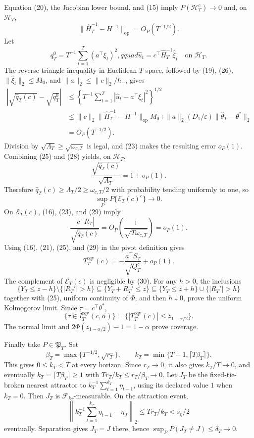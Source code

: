Equation (20), the Jacobian lower bound, and (15) imply \(P(\mathcal H_T^c)\to0\) and, on \(\mathcal H_T\),
\[
 \|\widehat H_T^{-1}-H^{-1}\|_{\mathrm{op}}=O_P(T^{-1/2}).
\tag{26}
\]
Let
\[
 q_T^0=T^{-1}\sum_{t=1}^T(a^\top\xi_t)^2,qquad
 \widehat u_t=c^\top\widehat H_T^{-1}\widehat\xi_t
 \quad\text{on }\mathcal H_T.
\tag{27}
\]
The reverse triangle inequality in Euclidean \(T\)-space, followed by (19), (26), \(\|\widehat\xi_t\|_2\le M_0\), and \(\|a\|_2\le\|c\|_2/h_-\), gives
\[
\begin{aligned}
 \left|\sqrt{\widehat q_T(c)}-\sqrt{q_T^0}\right|
 &\le\left\{T^{-1}\sum_{t=1}^T
 |\widehat u_t-a^\top\xi_t|^2\right\}^{1/2}\\
 &\le \|c\|_2\|\widehat H_T^{-1}-H^{-1}\|_{\mathrm{op}}M_0
 +\|a\|_2(D_1/\varepsilon)\|\widehat\theta_T-\theta^*\|_2\\
 &=O_P(T^{-1/2}).
\end{aligned}
\tag{28}
\]
Division by \(\sqrt{\Lambda_T}\ge\sqrt{\omega_{c,T}}\) is legal, and (23) makes the resulting error \(o_P(1)\).  Combining (25) and (28) yields, on \(\mathcal H_T\),
\[
 \frac{\sqrt{\widehat q_T(c)}}{\sqrt{\Lambda_T}}=1+o_P(1).
\tag{29}
\]
Therefore \(\widehat q_T(c)\ge\Lambda_T/2\ge\omega_{c,T}/2\) with probability tending uniformly to one, so
\[
 \sup_P P\{\mathcal E_T(c)^c\}\longrightarrow0.
\tag{30}
\]
On \(\mathcal E_T(c)\), (16), (23), and (29) imply
\[
 \frac{|c^\top R_T|}{\sqrt{\widehat q_T(c)}}
 =O_P\!\left(\frac1{\sqrt{T\omega_{c,T}}}\right)=o_P(1).
\tag{31}
\]
Using (16), (21), (25), and (29) in the pivot definition gives
\[
 T_T^{\mathrm{rqv}}(c)
 =-\frac{a^\top S_T}{\sqrt{Q_T^c}}+o_P(1).
\tag{32}
\]
The complement of \(\mathcal E_T(c)\) is negligible by (30).  For any \(h>0\), the inclusions
\[
 \{Y_T\le z-h\}\setminus\{|R_T'|>h\}
 \subseteq\{Y_T+R_T'\le z\}
 \subseteq\{Y_T\le z+h\}\cup\{|R_T'|>h\}
\tag{33}
\]
together with (25), uniform continuity of \(\Phi\), and then \(h\downarrow0\), prove the uniform Kolmogorov limit.  Since \(\tau=c^\top\theta^*\),
\[
 \{\tau\in I_T^{\mathrm{rqv}}(c,\alpha)\}
 =\{|T_T^{\mathrm{rqv}}(c)|\le z_{1-\alpha/2}\}.
\tag{34}
\]
The normal limit and \(2\Phi(z_{1-\alpha/2})-1=1-\alpha\) prove coverage.

Finally take \(P\in\mathfrak P_T\).  Set
\[
 \beta_T=\max\{T^{-1/2},\sqrt{r_T}\},\qquad
 k_T=\min\{T-1,\lceil T\beta_T\rceil\}.
\tag{35}
\]
This gives \(0\le k_T<T\) at every horizon.  Since \(r_T\to0\), it also gives \(k_T/T\to0\), and eventually \(k_T=\lceil T\beta_T\rceil\ge1\) with \(Tr_T/k_T\le r_T/\beta_T\to0\).  Let \(J_T\) be the fixed-tie-broken nearest attractor to \(k_T^{-1}\sum_{t=1}^{k_T}\eta_{t-1}\), using its declared value \(1\) when \(k_T=0\).  Then \(J_T\) is \(\mathcal F_{k_T}\)-measurable.  On the attraction event,
\[
 \left\|k_T^{-1}\sum_{t=1}^{k_T}\eta_{t-1}-\bar\eta_J\right\|_2
 \le Tr_T/k_T<s_\eta/2
\tag{36}
\]
eventually.  Separation gives \(J_T=J\) there, hence \(\sup_PP(J_T\ne J)\le\delta_T\to0\).

